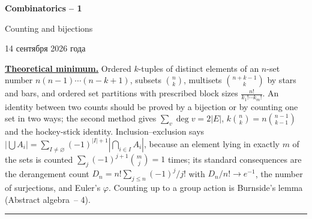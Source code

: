 \documentclass[11pt,a4paper]{article}
\newcommand{\head}[1]{\par\noindent\textbf{\underline{#1}}\quad}
\newcommand{\sheettitle}[4]{%
  \begin{center}
  {\huge\bfseries #1\par}\vspace{\dimexpr1.2em-1pt\relax minus 3.6pt}
  {\Large #2\par}\vspace{\dimexpr1em+1pt\relax minus 1.2pt}
  \if\relax\detokenize{#3}\relax\else{\Large #3\par}\vspace{\dimexpr1.15em-1pt\relax minus 3.6pt}\fi
  {\foreignlanguage{russian}{#4}\par}
  \end{center}\vspace{0.5pt minus 1.2pt}}
\begin{document}
\sheettitle{Combinatorics -- 1}{Counting and bijections}{Homework}{14 сентября 2026 года}

\head{Theoretical minimum.} Ordered $k$-tuples of distinct elements of an $n$-set number
$n(n-1)\cdots(n-k+1)$, subsets $\binom nk$, multisets $\binom{n+k-1}k$ by stars and bars, and
ordered set partitions with prescribed block sizes $\frac{n!}{k_1!\cdots k_m!}$. An identity
between two counts should be proved by a bijection or by counting one set in two ways; the second
method gives $\sum_v\deg v=2|E|$, $k\binom nk=n\binom{n-1}{k-1}$ and the hockey-stick identity.
Inclusion--exclusion says
$|\bigcup A_i|=\sum_{I\ne\varnothing}(-1)^{|I|+1}|\bigcap_{i\in I}A_i|$, because an element lying
in exactly $m$ of the sets is counted $\sum_j(-1)^{j+1}\binom mj=1$ times; its standard
consequences are the derangement count $D_n=n!\sum_{j\leqslant n}(-1)^j/j!$ with
$D_n/n!\to e^{-1}$, the number of surjections, and Euler's $\varphi$. Counting up to a group
action is Burnside's lemma (Abstract algebra~-- 4).

\par\vspace{-1pt}\noindent\rule{\linewidth}{0.4pt}\par\vspace{7pt}
\end{document}
